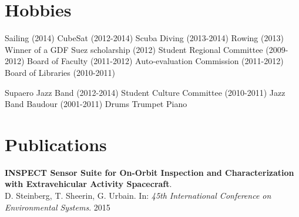 \documentclass[a4paper]{deedy-resume} %
\begin{document}
\sectionspace %


\section{Hobbies}
\vspace{5pt}
Sailing (2014) \textbullet{} CubeSat (2012-2014) \textbullet{} Scuba Diving (2013-2014) \textbullet{} Rowing (2013) \textbullet{} Winner of a GDF Suez scholarship (2012) \textbullet{}  Student Regional Committee (2009-2012) \textbullet{} Board of Faculty (2011-2012)  \textbullet{} Auto-evaluation Commission (2011-2012) \textbullet{} Board of Libraries (2010-2011)

\vspace{15pt}

Supaero Jazz Band (2012-2014) \textbullet{} Student Culture Committee (2010-2011) \textbullet{} Jazz Band Baudour (2001-2011) \textbullet{} Drums \textbullet{} Trumpet \textbullet{} Piano

\vspace{15pt}

\section{Publications}
\vspace{5pt}
\textbf{INSPECT Sensor Suite for On-Orbit Inspection and Characterization with Extravehicular Activity Spacecraft}.\\
D. Steinberg, T. Sheerin, G. Urbain. In: \textit{45th International Conference on Environmental Systems}. 2015


\end{document}
